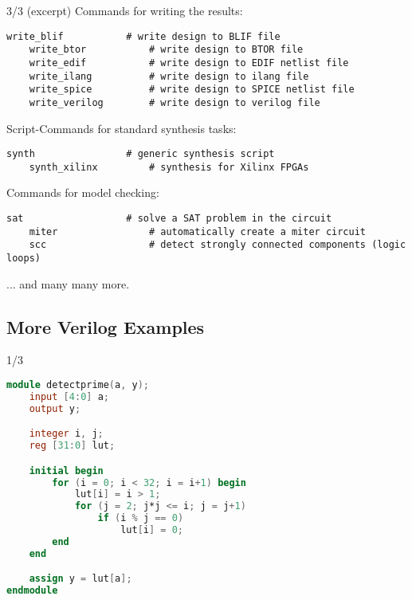\begin{frame}[fragile]{\subsecname{} 3/3 \hspace{0pt plus 1 filll} (excerpt)}
Commands for writing the results:
\begin{lstlisting}[xleftmargin=1cm, basicstyle=\ttfamily\fontsize{8pt}{10pt}\selectfont, language=ys]
    write_blif           # write design to BLIF file
    write_btor           # write design to BTOR file
    write_edif           # write design to EDIF netlist file
    write_ilang          # write design to ilang file
    write_spice          # write design to SPICE netlist file
    write_verilog        # write design to verilog file
\end{lstlisting}

\bigskip
Script-Commands for standard synthesis tasks:
\begin{lstlisting}[xleftmargin=1cm, basicstyle=\ttfamily\fontsize{8pt}{10pt}\selectfont, language=ys]
    synth                # generic synthesis script
    synth_xilinx         # synthesis for Xilinx FPGAs
\end{lstlisting}

\bigskip
Commands for model checking:
\begin{lstlisting}[xleftmargin=1cm, basicstyle=\ttfamily\fontsize{8pt}{10pt}\selectfont, language=ys]
    sat                  # solve a SAT problem in the circuit
    miter                # automatically create a miter circuit
    scc                  # detect strongly connected components (logic loops)
\end{lstlisting}

\bigskip
... and many many more.
\end{frame}


\subsection{More Verilog Examples}

\begin{frame}[fragile]{\subsecname{} 1/3}
\begin{lstlisting}[xleftmargin=1cm, basicstyle=\ttfamily\fontsize{8pt}{10pt}\selectfont, language=Verilog]
module detectprime(a, y);
    input [4:0] a;
    output y;

    integer i, j;
    reg [31:0] lut;

    initial begin
        for (i = 0; i < 32; i = i+1) begin
            lut[i] = i > 1;
            for (j = 2; j*j <= i; j = j+1)
                if (i % j == 0)
                    lut[i] = 0;
        end
    end

    assign y = lut[a];
endmodule
\end{lstlisting}
\end{frame}

